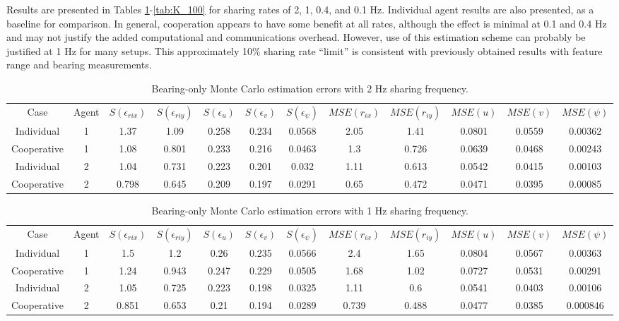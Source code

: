 \documentclass{aiaa-tc}
\begin{document}
Results are presented in Tables \ref{tab:K_5}-\ref{tab:K_100} for sharing rates of 2, 1, 0.4, and 0.1 Hz. Individual agent results are also presented, as a baseline for comparison. In general, cooperation appears to have some benefit at all rates, although the effect is minimal at 0.1 and 0.4 Hz and may not justify the added computational and communications overhead. However, use of this estimation scheme can probably be justified at 1 Hz for many setups. This approximately 10\% sharing rate ``limit'' is consistent with previously obtained results with feature range and bearing measurements.

\begin{table}[b!]
\scriptsize
\centering
\begin{tabular}{c|c|c|c|c|c|c|c|c|c|c|c|}
Case & Agent & $S(\epsilon_{rix})$ & $S(\epsilon_{riy})$ & $S(\epsilon_{u})$ & $S(\epsilon_{v})$ & $S(\epsilon_{\psi})$ & $MSE(r_{ix})$ & $MSE(r_{iy})$ & $MSE(u)$ & $MSE(v)$ & $MSE(\psi)$ \\
Individual & 1& 1.37& 1.09& 0.258& 0.234& 0.0568& 2.05& 1.41& 0.0801& 0.0559& 0.00362 \\
Cooperative & 1& 1.08& 0.801& 0.233& 0.216& 0.0463& 1.3& 0.726& 0.0639& 0.0468& 0.00243 \\
Individual & 2& 1.04& 0.731& 0.223& 0.201& 0.032& 1.11& 0.613& 0.0542& 0.0415& 0.00103 \\
Cooperative & 2& 0.798& 0.645& 0.209& 0.197& 0.0291& 0.65& 0.472& 0.0471& 0.0395& 0.00085
\end{tabular}
\caption{Bearing-only Monte Carlo estimation errors with 2 Hz sharing frequency.}
\label{tab:K_5}
\end{table}

\begin{table}[b!]
\scriptsize
\centering
\begin{tabular}{c|c|c|c|c|c|c|c|c|c|c|c|}
Case & Agent & $S(\epsilon_{rix})$ & $S(\epsilon_{riy})$ & $S(\epsilon_{u})$ & $S(\epsilon_{v})$ & $S(\epsilon_{\psi})$ & $MSE(r_{ix})$ & $MSE(r_{iy})$ & $MSE(u)$ & $MSE(v)$ & $MSE(\psi)$ \\
Individual & 1& 1.5& 1.2& 0.26& 0.235& 0.0566& 2.4& 1.65& 0.0804& 0.0567& 0.00363 \\
Cooperative & 1& 1.24& 0.943& 0.247& 0.229& 0.0505& 1.68& 1.02& 0.0727& 0.0531& 0.00291 \\
Individual & 2& 1.05& 0.725& 0.223& 0.198& 0.0325& 1.11& 0.6& 0.0541& 0.0403& 0.00106 \\
Cooperative & 2& 0.851& 0.653& 0.21& 0.194& 0.0289& 0.739& 0.488& 0.0477& 0.0385& 0.000846
\end{tabular}
\caption{Bearing-only Monte Carlo estimation errors with 1 Hz sharing frequency.}
\label{tab:K_10}
\end{table}
\end{document}
